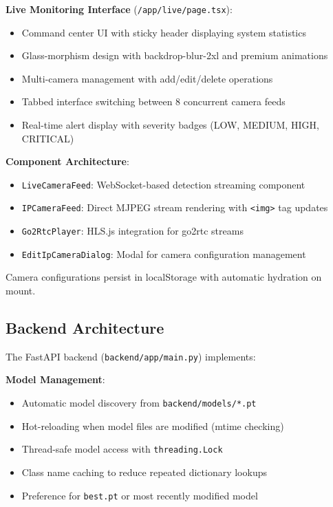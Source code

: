 \documentclass[conference]{IEEEtran}
\begin{document}
\textbf{Live Monitoring Interface} (\texttt{/app/live/page.tsx}):
\begin{itemize}
    \item Command center UI with sticky header displaying system statistics
    \item Glass-morphism design with backdrop-blur-2xl and premium animations
    \item Multi-camera management with add/edit/delete operations
    \item Tabbed interface switching between 8 concurrent camera feeds
    \item Real-time alert display with severity badges (LOW, MEDIUM, HIGH, CRITICAL)
\end{itemize}

\textbf{Component Architecture}:
\begin{itemize}
    \item \texttt{LiveCameraFeed}: WebSocket-based detection streaming component
    \item \texttt{IPCameraFeed}: Direct MJPEG stream rendering with \texttt{<img>} tag updates
    \item \texttt{Go2RtcPlayer}: HLS.js integration for go2rtc streams
    \item \texttt{EditIpCameraDialog}: Modal for camera configuration management
\end{itemize}

Camera configurations persist in localStorage with automatic hydration on mount.

\subsection{Backend Architecture}
The FastAPI backend (\texttt{backend/app/main.py}) implements:

\textbf{Model Management}:
\begin{itemize}
    \item Automatic model discovery from \texttt{backend/models/*.pt}
    \item Hot-reloading when model files are modified (mtime checking)
    \item Thread-safe model access with \texttt{threading.Lock}
    \item Class name caching to reduce repeated dictionary lookups
    \item Preference for \texttt{best.pt} or most recently modified model
\end{itemize}
\end{document}

